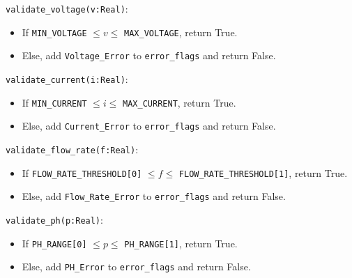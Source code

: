 \documentclass[12pt, titlepage]{article}
\begin{document}
\begin{description}
\begin{description}
  \item[Access Routine Semantics:]
  \item
  \texttt{validate\_voltage(v:Real)}:
  \item
  \begin{itemize}
    \item If \texttt{MIN\_VOLTAGE} $\leq v \leq$ \texttt{MAX\_VOLTAGE}, return True.
  \end{itemize}
  \item
  \begin{itemize}
    \item Else, add \texttt{Voltage\_Error} to \texttt{error\_flags} and return False.
  \end{itemize}
  \item 

  \texttt{validate\_current(i:Real)}:
  \item
  \begin{itemize}
    \item If \texttt{MIN\_CURRENT} $\leq i \leq$ \texttt{MAX\_CURRENT}, return True.
  \end{itemize}
  \item
  \begin{itemize}
    \item Else, add \texttt{Current\_Error} to \texttt{error\_flags} and return False.
  \end{itemize}
  \item 

  \texttt{validate\_flow\_rate(f:Real)}:
  \item
  \begin{itemize}
    \item If \texttt{FLOW\_RATE\_THRESHOLD[0]} $\leq f \leq$ \texttt{FLOW\_RATE\_THRESHOLD[1]}, return True.
  \end{itemize}
  \item
  \begin{itemize}
    \item Else, add \texttt{Flow\_Rate\_Error} to \texttt{error\_flags} and return False.
  \end{itemize}
  \item 

  \texttt{validate\_ph(p:Real)}:
  \item
  \begin{itemize}
    \item If \texttt{PH\_RANGE[0]} $\leq p \leq$ \texttt{PH\_RANGE[1]}, return True.
  \end{itemize}
  \item
  \begin{itemize}
    \item Else, add \texttt{PH\_Error} to \texttt{error\_flags} and return False.
  \end{itemize}
  \item 


\end{description}
\end{description}
\end{document}
